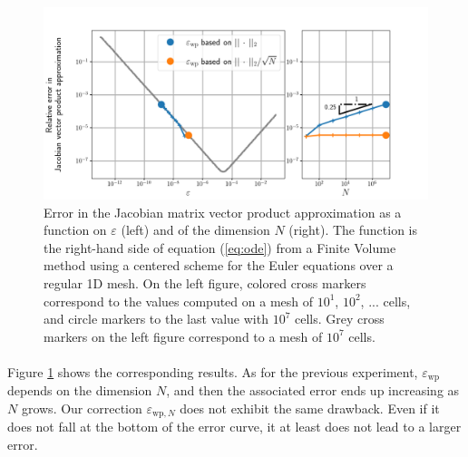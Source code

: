       \begin{figure}
        \centering
        \includegraphics[width=\textwidth]{figures/epsilon_Euler.png}
        \caption{
          Error in the Jacobian matrix vector product approximation as a function on $\varepsilon$ (left) and of the dimension $N$ (right).
          The function is the right-hand side of equation (\ref{eq:ode}) from a Finite Volume method using a centered scheme for the Euler equations over a regular 1D mesh.
          On the left figure, colored cross markers correspond to the values computed on a mesh of $10^1$, $10^2$, ... cells, and circle markers to the last value with $10^7$ cells.
          Grey cross markers on the left figure correspond to a mesh of $10^7$ cells.
        }
        \label{fig:epsilon_euler}
      \end{figure}

      \paragraph{}
      Figure \ref{fig:epsilon_euler} shows the corresponding results.
      As for the previous experiment, $\varepsilon_\textrm{wp}$ depends on the dimension $N$, and then the associated error ends up increasing as $N$ grows.
      Our correction $\varepsilon_{\textrm{wp}, N}$ does not exhibit the same drawback.
      Even if it does not fall at the bottom of the error curve, it at least does not lead to a larger error.

